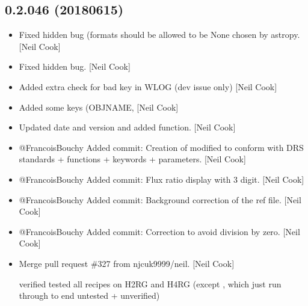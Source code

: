 \documentclass[a4paper,10pt,english]{report}
\begin{document}
\subsection{0.2.046 (2018\sphinxhyphen{}06\sphinxhyphen{}15)}
\label{\detokenize{misc/changelog:id438}}\begin{itemize}
\item {} 
Fixed hidden bug (formats should be allowed to be None \sphinxhyphen{} chosen by
astropy. {[}Neil Cook{]}

\item {} 
Fixed hidden bug. {[}Neil Cook{]}

\item {} 
Added extra check for bad key in WLOG (dev issue only) {[}Neil Cook{]}

\item {} 
Added some keys (OBJNAME,  {[}Neil Cook{]}

\item {} 
Updated date and version and added  function. {[}Neil
Cook{]}

\item {} 
@FrancoisBouchy \sphinxhyphen{} Added commit: Creation of  \sphinxhyphen{}
modified to conform with DRS standards + functions + keywords +
parameters. {[}Neil Cook{]}

\item {} 
@FrancoisBouchy \sphinxhyphen{} Added commit: Flux ratio display with 3 digit. {[}Neil
Cook{]}

\item {} 
@FrancoisBouchy \sphinxhyphen{} Added commit: Background correction of the ref file.
{[}Neil Cook{]}

\item {} 
@FrancoisBouchy \sphinxhyphen{} Added commit: Correction to avoid division by zero.
{[}Neil Cook{]}

\item {} 
Merge pull request \#327 from njcuk9999/neil. {[}Neil Cook{]}

verified \sphinxhyphen{} tested all recipes on H2RG and H4RG (except ,  \sphinxhyphen{} which just run through to end \sphinxhyphen{} untested + unverified)

\end{itemize}
\end{document}
